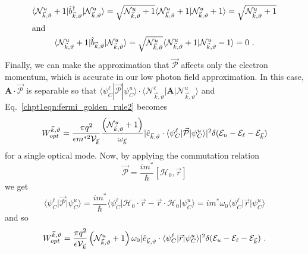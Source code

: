 \documentclass[12pt]{report}
\begin{document}
{\begin{subequations}
\begin{gather}
\langle \mathcal{N}_{\vec{k},\vartheta}^u+1 | \hat{b}^\dagger_{\vec{k},\vartheta} | \mathcal{N}_{\vec{k},\vartheta}^u \rangle =  \sqrt{\mathcal{N}_{\vec{k},\vartheta}^u+1} \langle \mathcal{N}_{\vec{k},\vartheta}^u+1 | \mathcal{N}_{\vec{k},\vartheta}^u+1 \rangle = \sqrt{\mathcal{N}_{\vec{k},\vartheta}^u+1}\\
\intertext{and}
\langle \mathcal{N}_{\vec{k},\vartheta}^u+1 | \hat{b}_{\vec{k},\vartheta} | \mathcal{N}_{\vec{k},\vartheta}^u \rangle = \sqrt{\mathcal{N}_{\vec{k},\vartheta}^u} \langle \mathcal{N}_{\vec{k},\vartheta}^u+1 | \mathcal{N}_{\vec{k},\vartheta}^u-1 \rangle = 0 {~.}
\end{gather}
\end{subequations}
Finally, we can make the approximation that $\vec{\mathcal{P}}$ affects only the electron momentum, which is accurate in our low photon field approximation.  In this case, ${\textbf{A}} \cdot \vec{\mathcal{P}}$ is separable so that $\langle \psi_C^\ell | \vec{\mathcal{P}} | \psi_C^u \rangle \cdot \langle \mathcal{N}_{\vec{k},\vartheta}^\ell \vert {\textbf{A}} \vert \mathcal{N}_{\vec{k},\vartheta}^u  \rangle$
and Eq.~\eqref{chpt1eqn:fermi_golden_rule2} becomes
\begin{equation}
\label{chpt1eqn:fermi_golden_rule3}
W_{opt}^{\vec{k},\vartheta} = \frac{\pi q^2}{\epsilon m^{*2} \mathcal{V}_{\vec{k}}}
\frac{\left(\mathcal{N}_{\vec{k},\vartheta}^u+1\right)}{\omega_{\vec{k}}}
\vert \hat{e}_{\vec{k},\vartheta} \cdot \langle \psi_C^\ell \vert \vec{\mathcal{P}}
\vert \psi_C^u\rangle\vert^2 \delta(\EE_u-\EE_\ell-\EE_{\vec{k}})
\end{equation}
for a single optical mode.  Now, by applying the commutation relation \cite{CohenTannoudji}
\begin{equation}
\vec{\mathcal{P}} = \frac{i m^*}{\hslash} [\mathscr{H}_0,\vec{r}]
\end{equation}
we get
\begin{equation}
\langle \psi_C^\ell \vert \vec{\mathcal{P}}
\vert \psi_C^u\rangle = \frac{i m^*}{\hslash} \langle \psi_C^\ell \vert \mathscr{H}_0\cdot\vec{r} - \vec{r}\cdot\mathscr{H}_0 \vert \psi_C^u\rangle = i m^* \omega_{0} \langle \psi_C^\ell \vert \vec{r} \vert \psi_C^u\rangle
\end{equation}
and so
\begin{equation}
W_{opt}^{\vec{k},\vartheta} = \frac{\pi q^2}{\epsilon \mathcal{V}_{\vec{k}}} \left(\mathcal{N}_{\vec{k},\vartheta}^u+1\right) \omega_{0}
\vert\hat{e}_{\vec{k},\vartheta} \cdot \langle \psi_C^\ell \vert \vec{r} \vert \psi_C^u\rangle\vert^2 \delta(\EE_u-\EE_\ell-\EE_{\vec{k}}) {~.}

\end{equation}}
\end{document}
